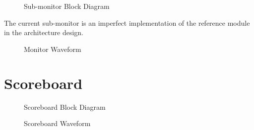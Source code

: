 \begin{figure}[H]
  \centering
  
  \caption{Sub-monitor Block Diagram}
  \label{SubmonBlk}
\end{figure}

The current sub-monitor is an imperfect implementation of the reference module in the architecture design.


\begin{figure}[H]
  \centering
  
  \caption{Monitor Waveform}
  \label{MonitorWave}
\end{figure}

\section{Scoreboard}

\begin{figure}[H]
  \centering
  
  \caption{Scoreboard Block Diagram}
  \label{ScoreboardBlk}
\end{figure}

\begin{figure}[H]
  \centering
  
  \caption{Scoreboard Waveform}
  \label{ScoreboardWave}
\end{figure}

